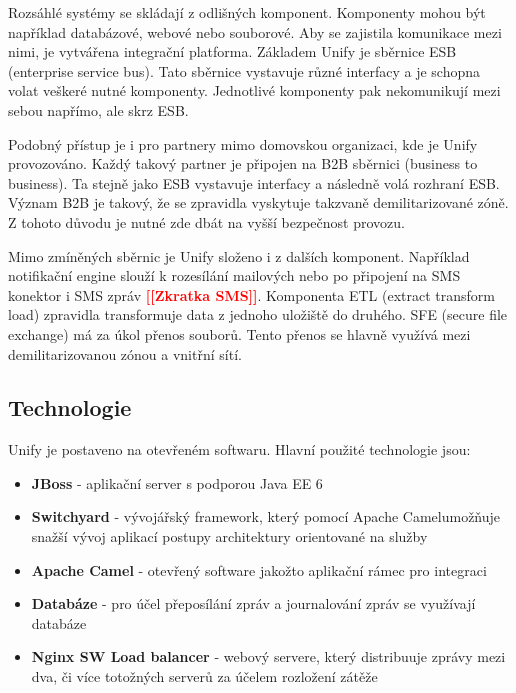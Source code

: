 \documentclass[thesis=M,czech]{FITthesis}[2012/10/20]
\newcommand{\todo}[1]{\textcolor{red}{\textbf{[[#1]]}}}
\begin{document}
			Rozsáhlé systémy se skládají z odlišných komponent. Komponenty mohou být například databázové, webové nebo souborové. Aby se zajistila komunikace mezi nimi, je vytvářena integrační platforma. Základem Unify je sběrnice ESB (enterprise service bus). Tato sběrnice vystavuje různé interfacy a je schopna volat veškeré nutné komponenty. Jednotlivé komponenty pak nekomunikují mezi sebou napřímo, ale skrz ESB. 
			
			Podobný přístup je i pro partnery mimo domovskou organizaci, kde je Unify provozováno. Každý takový partner je připojen na B2B sběrnici (business to business). Ta stejně jako ESB vystavuje interfacy a následně volá rozhraní ESB. Význam B2B je takový, že se zpravidla vyskytuje takzvaně demilitarizované zóně. Z tohoto důvodu je nutné zde dbát na vyšší bezpečnost provozu.
			
			Mimo zmíněných sběrnic je Unify složeno i z dalších komponent. Například notifikační engine slouží k rozesílání mailových nebo po připojení na SMS konektor i SMS zpráv \todo{Zkratka SMS}. Komponenta ETL (extract transform load) zpravidla transformuje data z jednoho uložiště do druhého. SFE (secure file exchange) má za úkol přenos souborů. Tento přenos se hlavně využívá mezi demilitarizovanou zónou a vnitřní sítí.
			
		\subsection{Technologie}
			\label{sec:unify-technologi}
			Unify je postaveno na otevřeném softwaru. Hlavní použité technologie jsou: 
			
			\begin{itemize} 
				\item \textbf{JBoss} - aplikační server s podporou Java EE 6 \cite{oracleJavaEE6}
				\item \textbf{Switchyard} - vývojářský framework, který pomocí Apache Camel\texttrademark  umožňuje snažší vývoj aplikací postupy architektury orientované na služby 
				\item \textbf{Apache Camel \texttrademark } - otevřený software jakožto aplikační rámec pro integraci
				\item \textbf{Databáze} - pro účel přeposílání zpráv a journalování zpráv se využívají databáze
				\item \textbf{Nginx SW Load balancer} - webový servere, který distribuuje zprávy mezi dva, či více totožných serverů za účelem rozložení zátěže   		
			\end{itemize}
			
\end{document}
